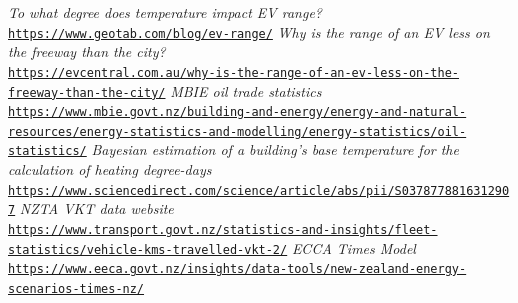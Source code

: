 \documentclass[
]{article}
\begin{document}
\begin{thebibliography}{9}
\textit{To what degree does temperature impact EV range?}
\\\texttt{\url{https://www.geotab.com/blog/ev-range/}}
\textit{Why is the range of an EV less on the freeway than the city?}
\\\texttt{\url{https://evcentral.com.au/why-is-the-range-of-an-ev-less-on-the-freeway-than-the-city/}}
\textit{MBIE oil trade statistics}
\\\texttt{\url{https://www.mbie.govt.nz/building-and-energy/energy-and-natural-resources/energy-statistics-and-modelling/energy-statistics/oil-statistics/}}
\textit{Bayesian estimation of a building's base temperature for the calculation of heating degree-days}
\\\texttt{\url{https://www.sciencedirect.com/science/article/abs/pii/S0378778816312907}}
\textit{NZTA VKT data website}
\\\texttt{\url{https://www.transport.govt.nz/statistics-and-insights/fleet-statistics/vehicle-kms-travelled-vkt-2/}}
\textit{ECCA Times Model}
\\\texttt{\url{https://www.eeca.govt.nz/insights/data-tools/new-zealand-energy-scenarios-times-nz/}}
\end{thebibliography}
\end{document}
